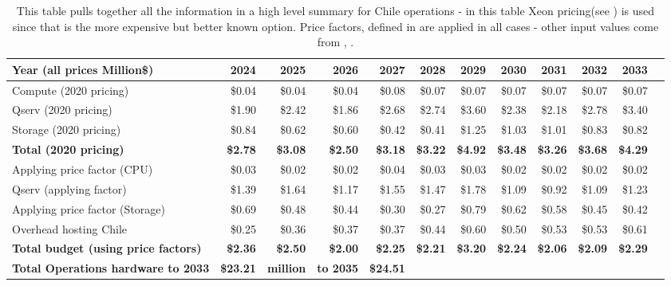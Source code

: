 \tiny \begin{longtable} { |p{}  |r  |r  |r  |r  |r  |r  |r  |r  |r  |r  |r |} 
\caption{This table pulls together all the information in a high level summary for Chile operations - in this table Xeon pricing(see ) is used since that is the more expensive but better known option. Price factors, defined in  are applied in all cases - other input values come from , .
 \label{tab:opsSumChile}}\\ 
\hline 
\textbf{Year  (all prices Million\$)}&\textbf{2024}&\textbf{2025}&\textbf{2026}&\textbf{2027}&\textbf{2028}&\textbf{2029}&\textbf{2030}&\textbf{2031}&\textbf{2032}&\textbf{2033} \\ \hline
{Compute (2020 pricing)}&{\$0.04}&{\$0.04}&{\$0.04}&{\$0.08}&{\$0.07}&{\$0.07}&{\$0.07}&{\$0.07}&{\$0.07}&{\$0.07} \\ \hline
{Qserv (2020 pricing)}&{\$1.90}&{\$2.42}&{\$1.86}&{\$2.68}&{\$2.74}&{\$3.60}&{\$2.38}&{\$2.18}&{\$2.78}&{\$3.40} \\ \hline
{Storage (2020 pricing)}&{\$0.84}&{\$0.62}&{\$0.60}&{\$0.42}&{\$0.41}&{\$1.25}&{\$1.03}&{\$1.01}&{\$0.83}&{\$0.82} \\ \hline
\textbf{Total (2020 pricing)}&\textbf{\$2.78}&\textbf{\$3.08}&\textbf{\$2.50}&\textbf{\$3.18}&\textbf{\$3.22}&\textbf{\$4.92}&\textbf{\$3.48}&\textbf{\$3.26}&\textbf{\$3.68}&\textbf{\$4.29} \\ \hline
{Applying price factor (CPU)}&{\$0.03}&{\$0.02}&{\$0.02}&{\$0.04}&{\$0.03}&{\$0.03}&{\$0.02}&{\$0.02}&{\$0.02}&{\$0.02} \\ \hline
{Qserv (applying factor)}&{\$1.39}&{\$1.64}&{\$1.17}&{\$1.55}&{\$1.47}&{\$1.78}&{\$1.09}&{\$0.92}&{\$1.09}&{\$1.23} \\ \hline
{Applying price factor (Storage)}&{\$0.69}&{\$0.48}&{\$0.44}&{\$0.30}&{\$0.27}&{\$0.79}&{\$0.62}&{\$0.58}&{\$0.45}&{\$0.42} \\ \hline
{Overhead hosting Chile}&{\$0.25}&{\$0.36}&{\$0.37}&{\$0.37}&{\$0.44}&{\$0.60}&{\$0.50}&{\$0.53}&{\$0.53}&{\$0.61} \\ \hline
\textbf{Total budget (using price factors)}&\textbf{\$2.36}&\textbf{\$2.50}&\textbf{\$2.00}&\textbf{\$2.25}&\textbf{\$2.21}&\textbf{\$3.20}&\textbf{\$2.24}&\textbf{\$2.06}&\textbf{\$2.09}&\textbf{\$2.29} \\ \hline
\textbf{Total Operations hardware to 2033}&\textbf{\$23.21}&\textbf{million}&\textbf{to 2035}&\textbf{\$24.51}&&&&&& \\ \hline
\end{longtable} \normalsize
